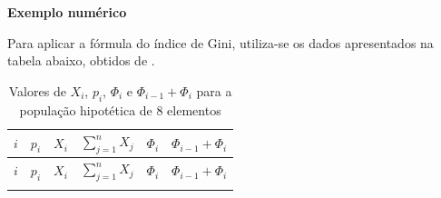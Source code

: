 \documentclass[
]{book}
\begin{document}
\textbf{Exemplo numérico}

Para aplicar a fórmula do índice de Gini, utiliza-se os dados apresentados na tabela abaixo, obtidos de \citet{Hoffmann2006}.

\begin{longtable}[]{@{}cccccc@{}}
\caption{\label{tab:DadosdoExemploNumericoParaGini} Valores de \(X_i\), \(p_i\), \(\Phi_i\) e \(\Phi_{i-1} + \Phi_i\) para a população hipotética de 8 elementos}\tabularnewline
\toprule
\begin{minipage}[b]{0.10\columnwidth}\centering
\(i\)\strut
\end{minipage} & \begin{minipage}[b]{0.12\columnwidth}\centering
\(p_i\)\strut
\end{minipage} & \begin{minipage}[b]{0.12\columnwidth}\centering
\(X_i\)\strut
\end{minipage} & \begin{minipage}[b]{0.18\columnwidth}\centering
\(\sum_{j=1}^{n}X_j\)\strut
\end{minipage} & \begin{minipage}[b]{0.09\columnwidth}\centering
\(\Phi_i\)\strut
\end{minipage} & \begin{minipage}[b]{0.20\columnwidth}\centering
\(\Phi_{i-1} + \Phi_i\)\strut
\end{minipage}\tabularnewline
\midrule
\endfirsthead
\toprule
\begin{minipage}[b]{0.10\columnwidth}\centering
\(i\)\strut
\end{minipage} & \begin{minipage}[b]{0.12\columnwidth}\centering
\(p_i\)\strut
\end{minipage} & \begin{minipage}[b]{0.12\columnwidth}\centering
\(X_i\)\strut
\end{minipage} & \begin{minipage}[b]{0.18\columnwidth}\centering
\(\sum_{j=1}^{n}X_j\)\strut
\end{minipage} & \begin{minipage}[b]{0.09\columnwidth}\centering
\(\Phi_i\)\strut
\end{minipage} & \begin{minipage}[b]{0.20\columnwidth}\centering
\(\Phi_{i-1} + \Phi_i\)\strut
\end{minipage}\tabularnewline
\midrule
\endhead
\begin{minipage}[t]{0.10\columnwidth}\centering

\end{minipage}
\end{longtable}
\end{document}
